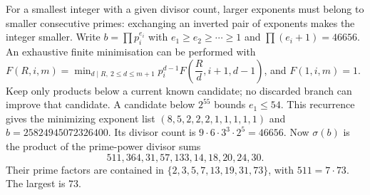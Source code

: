 For a smallest integer with a given divisor count, larger exponents must belong to smaller consecutive primes: exchanging an inverted pair of exponents makes the integer smaller. Write $b=\prod p_i^{e_i}$ with $e_1\ge e_2\ge\cdots\ge1$ and $\prod(e_i+1)=46656$.
An exhaustive finite minimisation can be performed with $F(R,i,m)=\min_{d\mid R,\ 2\le d\le m+1}p_i^{d-1}F(\dfrac{R}{d},i+1,d-1)$, and $F(1,i,m)=1$. Keep only products below a current known candidate; no discarded branch can improve that candidate. A candidate below $2^{55}$ bounds $e_1\le54$. This recurrence gives the minimizing exponent list $(8,5,2,2,2,1,1,1,1,1)$ and $b=25824945072326400$. Its divisor count is $9\cdot6\cdot3^3\cdot2^5=46656$.
Now $\sigma(b)$ is the product of the prime-power divisor sums
\[511,364,31,57,133,14,18,20,24,30.\]
Their prime factors are contained in $\{2,3,5,7,13,19,31,73\}$, with $511=7\cdot73$. The largest is $\boxed{73}$.
